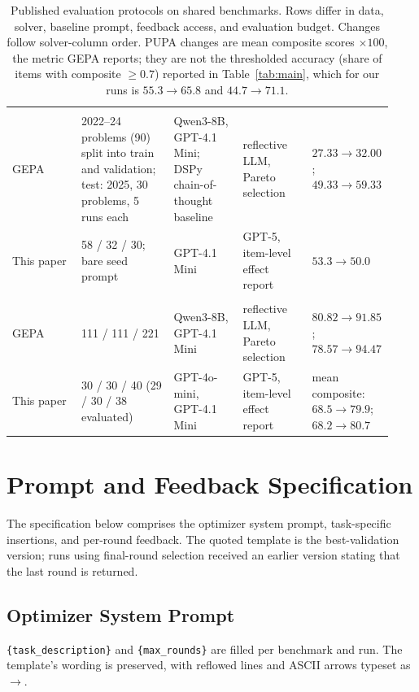 \documentclass[11pt]{article}
\begin{document}
\begin{table}[!tp]
\begin{tabular}{@{}p{0.18\linewidth}p{0.24\linewidth}p{0.18\linewidth}p{0.18\linewidth}p{0.15\linewidth}@{}}
\midrule
\rowcolor{midgreen}\multicolumn{5}{l}{\textbf{AIME}} \\
GEPA~\citep{agrawal2026gepa} & 2022--24 problems (90) split into train and validation; test: 2025, 30 problems, 5 runs each & Qwen3-8B, GPT-4.1 Mini; DSPy chain-of-thought baseline & reflective LLM, Pareto selection & $27.33\rightarrow 32.00$; $49.33\rightarrow 59.33$ \\
\rowcolor{softblue}This paper & 58 / 32 / 30; bare seed prompt & GPT-4.1 Mini & GPT-5, item-level effect report & $53.3\rightarrow 50.0$ \\
\midrule
\rowcolor{midgreen}\multicolumn{5}{l}{\textbf{PUPA}} \\
GEPA~\citep{agrawal2026gepa} & 111 / 111 / 221 & Qwen3-8B, GPT-4.1 Mini & reflective LLM, Pareto selection & $80.82\rightarrow 91.85$; $78.57\rightarrow 94.47$ \\
\rowcolor{softblue}This paper & 30 / 30 / 40 (29 / 30 / 38 evaluated) & GPT-4o-mini, GPT-4.1 Mini & GPT-5, item-level effect report & mean composite: $68.5\rightarrow 79.9$; $68.2\rightarrow 80.7$ \\
\bottomrule
\end{tabular}
\caption{Published evaluation protocols on shared benchmarks. Rows differ in data, solver, baseline prompt, feedback
access, and evaluation budget. Changes follow solver-column order. PUPA changes are mean composite scores
$\times 100$, the metric GEPA reports; they are not the thresholded accuracy (share of items with composite
$\geq 0.7$) reported in Table~\ref{tab:main}, which for our runs is $55.3\rightarrow 65.8$ and $44.7\rightarrow 71.1$.}
\label{tab:prior}
\end{table}

\FloatBarrier
\section{Prompt and Feedback Specification}
\label{app:prompts}
The specification below comprises the optimizer system prompt, task-specific insertions, and per-round feedback.
The quoted template is the best-validation version; runs using final-round selection received an earlier version
stating that the last round is returned.

\subsection{Optimizer System Prompt}
\label{app:sysprompt}
\texttt{\{task\_description\}} and \texttt{\{max\_rounds\}} are filled per benchmark and run. The template's wording is
preserved, with reflowed lines and ASCII arrows typeset as $\rightarrow$.
\end{document}
